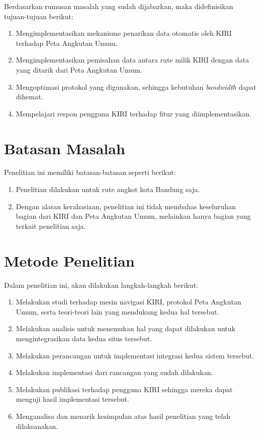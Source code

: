 Berdasarkan rumusan masalah yang sudah dijabarkan, maka didefinisikan tujuan-tujuan berikut:

\begin{enumerate}
	\item Mengimplementasikan mekanisme penarikan data otomatis oleh KIRI terhadap Peta Angkutan Umum.
	\item Mengimplementasikan pemisahan data antara rute milik KIRI dengan data yang ditarik dari Peta Angkutan Umum.
	\item Mengoptimasi protokol yang digunakan, sehingga kebutuhan \textit{bandwidth} dapat dihemat.
	\item Mempelajari respon pengguna KIRI terhadap fitur yang diimplementasikan.
\end{enumerate}

\section{Batasan Masalah}

Penelitian ini memiliki batasan-batasan seperti berikut:

\begin{enumerate}
	\item Penelitian dilakukan untuk rute angkot kota Bandung saja.
	\item Dengan alasan kerahasiaan, penelitian ini tidak membahas keseluruhan bagian dari KIRI dan Peta Angkutan Umum, melainkan hanya bagian yang terkait penelitian saja.
\end{enumerate}

\section{Metode Penelitian}

Dalam penelitian ini, akan dilakukan langkah-langkah berikut:

\begin{enumerate}
	\item Melakukan studi terhadap mesin navigasi KIRI, protokol Peta Angkutan Umum, serta teori-teori lain yang mendukung kedua hal tersebut.
	\item Melakukan analisis untuk menemukan hal yang dapat dilakukan untuk mengintegrasikan data kedua situs tersebut.
	\item Melakukan perancangan untuk implementasi integrasi kedua sistem tersebut.
	\item Melakukan implementasi dari rancangan yang sudah dilakukan.
	\item Melakukan publikasi terhadap pengguna KIRI sehingga mereka dapat menguji hasil implementasi tersebut.
	\item Menganalisa dan menarik kesimpulan atas hasil penelitian yang telah dilaksanakan.
\end{enumerate}

